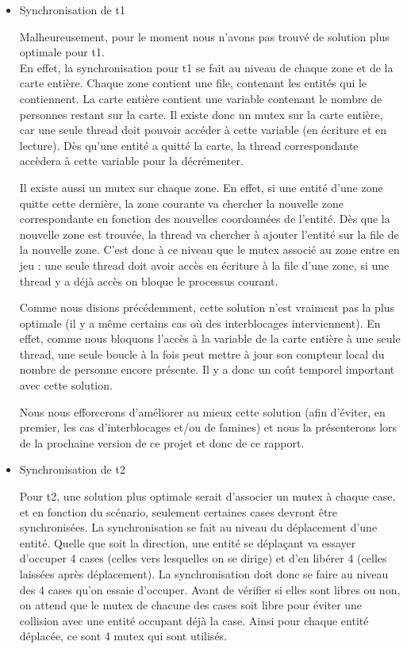 \documentclass[11pt]{article} %
\begin{document}
\begin{itemize}
	\item{Synchronisation de t1}

Malheureusement, pour le moment nous n'avons pas trouvé de solution plus optimale pour t1. \\
En effet, la synchronisation pour t1 se fait au niveau de chaque zone et de la carte entière. Chaque zone contient une file, contenant les entités qui le contiennent. 
La carte entière contient une variable contenant le nombre de personnes restant sur la carte. Il existe donc un mutex sur la carte entière, car une seule thread doit pouvoir accéder à cette variable (en écriture et en lecture).
Dès qu'une entité a quitté la carte, la thread correspondante accèdera à cette variable pour la décrémenter.

Il existe aussi un mutex sur chaque zone. En effet, si une entité d'une zone quitte cette dernière,  la zone courante va chercher la nouvelle zone correspondante en fonction des nouvelles coordonnées de l'entité. Dès que la nouvelle zone est trouvée, la thread va chercher à ajouter l'entité sur la file de la nouvelle zone. C'est donc à ce niveau que le mutex associé au zone entre en jeu : une seule thread doit avoir accès en écriture à la file d'une zone, si une thread y a déjà accès on bloque le processus courant.

Comme nous disions précédemment, cette solution n'est vraiment pas la plus optimale (il y a même certains cas où des interblocages interviennent). En effet, comme nous bloquons l'accès à la variable de la carte entière à une seule thread, une seule boucle à la fois peut mettre à jour son compteur local du nombre de personne encore présente. Il y a donc un coût temporel important avec cette solution.


Nous nous efforcerons d'améliorer au mieux cette solution (afin d'éviter, en premier, les cas d'interblocages et/ou de famines) et nous la présenterons lors de la prochaine version de ce projet et donc de ce rapport.


	\item{Synchronisation de t2} 

Pour t2, une solution plus optimale serait d'associer un mutex à chaque case, et en fonction du scénario, seulement certaines cases devront être synchronisées. 
La synchronisation se fait au niveau du déplacement d'une entité. Quelle que soit la direction, une entité se déplaçant va essayer d'occuper 4 cases (celles vers lesquelles on se dirige) et d'en libérer 4 (celles laissées après déplacement). La synchronisation doit donc se faire au niveau des 4 cases qu'on essaie d'occuper. Avant de vérifier si elles sont libres ou non, on attend que le mutex de chacune des cases soit libre pour éviter une collision avec une entité occupant déjà la case. Ainsi pour chaque entité déplacée, ce sont 4 mutex qui sont utilisés.

\end {itemize}
\end{document}

